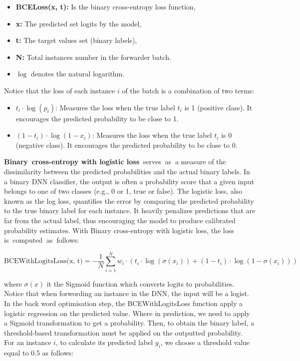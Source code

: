 \begin{itemize}
  \item \textbf{BCELoss(x, t):} Is the binary cross-entropy loss function,
  \item \textbf{x:} The predicted set logits by the model,
  \item \textbf{t:} The target values set (binary labels),
  \item \textbf{N:} Total instances number in the forwarder batch.
  \item \(\log\) denotes the natural logarithm.

\end{itemize}

Notice that the loss of each instance $i$ of the batch is a combination of two terms:
\begin{itemize}
    \item $t_i \cdot \log(p_i)$: Measures the loss when the true label $t_i$ is 1 (positive class). It encourages the predicted probability to be close to 1.
    \item $(1 - t_i) \cdot \log(1 - x_i)$: Measures the loss when the true label $t_i$ is 0 (negative class). It encourages the predicted probability to be close to 0.
\end{itemize}
\textbf{Binary\textcolor{white}{..}cross-entropy with logistic loss}\textcolor{white}{..}serves\textcolor{white}{..}as\textcolor{white}{..}a measure of the dissimilarity between the predicted probabilities and the actual binary labels. In a binary DNN classifier, the output is often a probability score that a given input belongs to one of two classes (e.g., 0 or 1, true or false). The logistic loss, also known as the log loss, quantifies the error by comparing the predicted probability to the true binary label for each instance. It heavily penalizes predictions that are far from the actual label, thus encouraging the model to produce calibrated probability estimates.
With Binary cross-entropy with logistic loss, the loss is\textcolor{white}{..}computed\textcolor{white}{..}as\textcolor{white}{..}follows:

\begin{equation}
\text{BCEWithLogitsLoss(x, t)} = - \frac{1}{N} \sum_{i=1}^{N} w_i \cdot \left(t_i \cdot \log(\sigma(x_i)) + (1 - t_i) \cdot \log(1 - \sigma(x_i))\right)
\end{equation}

where $\sigma(x)$ it the Sigmoid function which converts logits to probabilities.
Notice that when forwording an instance in the DNN, the input will be a logist. In the back word optimisation step, the BCEWithLogitsLoss function apply a logistic regression on the predicted value. Where in prediction, we need to apply a Sigmoid transformation to get a probability. Then, to obtain the binary label, a threshold-based transformation must be applied on the outputted probability. \\
For an instance $i$, to calculate its predicted label $y_i$, we choose a threshold value equal to 0.5 as follows:

